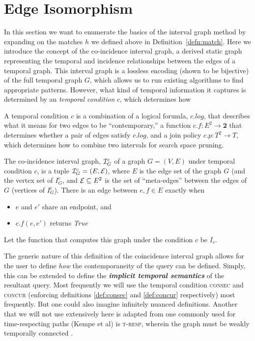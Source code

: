 \section{Edge Isomorphism}

In this section we want to enumerate the basics of the interval graph method by
expanding on the matches $h$ we defined above in
Definition~\ref{defn:match}. Here we introduce the concept of the co-incidence
interval graph, a derived static graph representing the temporal and incidence
relationships between the edges of a temporal graph. This interval graph is a
lossless encoding (shown to be bijective) of the full temporal graph $G$, which
allows us to run existing algorithms to find appropriate patterns. However, what
kind of temporal information it captures is determined by an \textit{temporal
  condition} $c$, which determines how 

\begin{defn}
  A temporal condition $c$ is a combination of a logical forumla, $c.log$, that
  describes what it means for two edges to be ``contemporary,'' a function
  $c.f : E^2 \to \textbf{2}$ that determines whether a pair of edges satisfy
  $c.log$, and a join policy $c.p: T^2 \to T$, which determines how to combine two
  intervals for search space pruning.
\end{defn}

\begin{defn}
  The co-incidence interval graph, $\mathcal{I}_G^c$ of a graph $G = (V,E)$ under
  temporal condition $c$, is a tuple $\mathcal{I}_G^c = (E, \mathcal{E})$, where $E$ is the edge
  set of the graph $G$ (and the vertex set of $I_G^c$, and $\mathcal{E} \subseteq E^2$ is
  the set of ``meta-edges'' between the edges of $G$ (vertices of
  $I_G^c$). There is an edge between $e,f \in E$ exactly when
  \begin{itemize}
    \item $e$ and $e'$ share an endpoint, and
    \item $c.f(e,e')$ returns \emph{True}
  \end{itemize}

  Let the function that computes this graph under the condition $c$ be $I_c$.
\end{defn}

The generic nature of this definition of the coincidence interval graph allows
for the user to define \textit{how} the contemporaneity of the query can be
defined. Simply, this can be extended to define the \textit{\bf implicit
  temporal semantics} of the resultant query. Most frequently we will use the
temporal condition \textsc{consec} and \textsc{concur} (enforcing definitions
\ref{def:consec} and \ref{def:concur} respectively) most frequently. But one
could also imagine infinitely nuanced definitions. Another that we will not use
extensively here  is adapted from one commonly used for
time-respecting paths (Kempe et al) is \textsc{t-resp}, wherein the graph must
be weakly temporally connected . \\[.5em]

